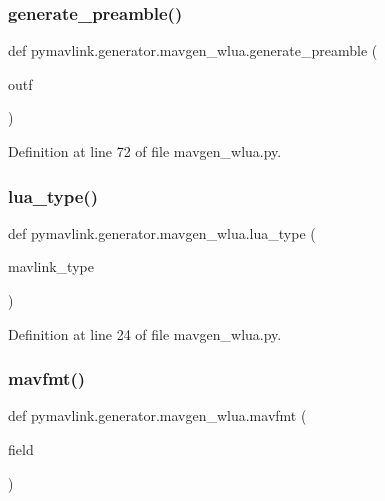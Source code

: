 \subsubsection{\texorpdfstring{generate\_preamble()}{generate\_preamble()}}
{\footnotesize\ttfamily def pymavlink.\+generator.\+mavgen\+\_\+wlua.\+generate\+\_\+preamble (\begin{DoxyParamCaption}\item[{}]{outf }\end{DoxyParamCaption})}



Definition at line 72 of file mavgen\+\_\+wlua.\+py.

\mbox{\label{namespacepymavlink_1_1generator_1_1mavgen__wlua_a2f87dcc75f8b9a6b8b417bf387b1a224}} 
\subsubsection{\texorpdfstring{lua\_type()}{lua\_type()}}
{\footnotesize\ttfamily def pymavlink.\+generator.\+mavgen\+\_\+wlua.\+lua\+\_\+type (\begin{DoxyParamCaption}\item[{}]{mavlink\+\_\+type }\end{DoxyParamCaption})}



Definition at line 24 of file mavgen\+\_\+wlua.\+py.

\mbox{\label{namespacepymavlink_1_1generator_1_1mavgen__wlua_a1007bc04078ec16dd974ffb4cbb23475}} 
\subsubsection{\texorpdfstring{mavfmt()}{mavfmt()}}
{\footnotesize\ttfamily def pymavlink.\+generator.\+mavgen\+\_\+wlua.\+mavfmt (\begin{DoxyParamCaption}\item[{}]{field }\end{DoxyParamCaption})}

